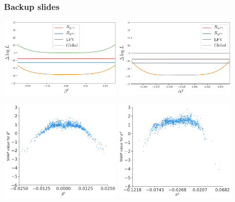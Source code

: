 \documentclass[mathserif, 10pt]{beamer}
\begin{document}
\begin{frame}
    \frametitle{Backup slides}

    \begin{center}
        \includegraphics[width=0.45\textwidth]{figures/evoplot_betal.pdf}
        \includegraphics[width=0.45\textwidth]{figures/evoplot_alphaq.pdf}   \end{center}
    \begin{center}
        \includegraphics[width=0.45\textwidth]{figures/SHAP_bl.pdf}
        \includegraphics[width=0.45\textwidth]{figures/SHAP_aq.pdf}
    \end{center}

\end{frame}
\end{document}
